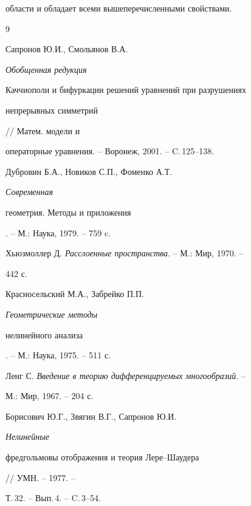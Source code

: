 области и обладает всеми вышеперечисленными свойствами. 


 


 


\begin{thebibliography}{9} 


 




Сапронов Ю.И., Смольянов В.А. {\em Обобщенная редукция 


Каччиополи и бифуркации решений уравнений при разрушениях 


непрерывных симметрий} // Матем. модели и 


операторные уравнения. -- Воронеж, 2001. -- C.\,125--138. 




Дубровин Б.А., Новиков С.П., Фоменко А.Т. {\em Современная 


геометрия. Методы и приложения}. -- М.: Наука, 1979. -- 759 c. 




Хьюзмоллер Д. {\em Расслоенные пространства}. -- М.: Мир, 1970. -- 


442 с. 




Красносельский М.А., Забрейко П.П. {\em Геометрические методы 


нелинейного анализа}. -- М.: Наука, 1975. -- 511 с. 




Ленг С. {\em Введение в теорию дифференцируемых многообразий}. -- 


М.: Мир, 1967. -- 204 с. 




Борисович Ю.Г., Звягин В.Г., Сапронов Ю.И. {\em Нелинейные 


фредгольмовы отображения и теория Лере--Шаудера} // УМН. -- 1977. -- 


Т.\,32. -- Вып.\,4. -- C.\,3--54. 


 


\end{thebibliography} 


 


\vskip 2cm 


 






 


\label{end} 


 



